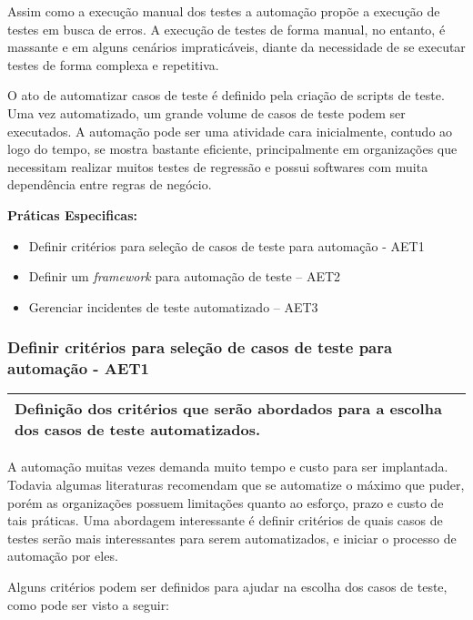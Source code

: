 Assim como a execução manual dos testes a automação propõe a execução de testes em busca de erros. A execução de testes de forma manual, no entanto, é massante e em alguns cenários impraticáveis, diante da necessidade de se executar testes de forma complexa e repetitiva.

O ato de automatizar casos de teste é definido pela criação de scripts de teste. Uma vez automatizado, um grande volume de casos de teste podem ser executados. A automação pode ser uma atividade cara inicialmente, contudo ao logo do tempo, se mostra bastante eficiente, principalmente em organizações que necessitam realizar muitos testes de regressão e possui softwares com muita dependência entre regras de negócio.

\textbf{Práticas Especificas:}
\begin{itemize}
    \item Definir critérios para seleção de casos de teste para automação - AET1
    \item Definir um \textit{framework} para automação de teste – AET2
    \item Gerenciar incidentes de teste automatizado – AET3
\end{itemize}

\subsubsection{Definir critérios para seleção de casos de teste para automação - AET1}
\label{sec:aet1}

\begin{table}[H]
\centering
\begin{tabular}{|p{130mm}|}
\hline
Definição dos critérios que serão abordados para a escolha dos casos de teste automatizados. \\ 
\hline
\end{tabular}
\end{table}

A automação muitas vezes demanda muito tempo e custo para ser implantada. Todavia algumas literaturas recomendam que se automatize o máximo que puder, porém as organizações possuem limitações quanto ao esforço, prazo e custo de tais práticas. Uma abordagem interessante é definir critérios de quais casos de testes serão mais interessantes para serem automatizados, e iniciar o processo de automação por eles.

Alguns critérios podem ser definidos para ajudar na escolha dos casos de teste, como pode ser visto a seguir:

